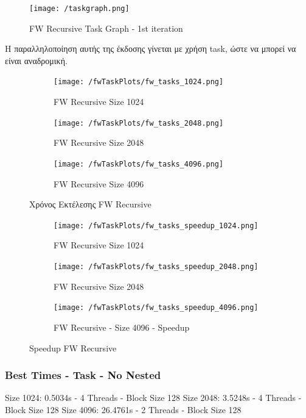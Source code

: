 \documentclass[letterpaper,12pt]{article}
\begin{document}
\begin{figure}[H]
    \centering
    \texttt{[image: /taskgraph.png]}
    \caption{FW Recursive Task Graph - 1st iteration}
    \label{fig:FW Recursive Task Graph}
\end{figure}

Η παραλληλοποίηση αυτής της έκδοσης γίνεται με χρήση task, ώστε να μπορεί να είναι αναδρομική.


\begin{figure}[H]
    \centering
    \begin{subfigure}[b]{0.45\linewidth}
        \texttt{[image: /fwTaskPlots/fw\_tasks\_1024.png]}
        \caption{FW Recursive Size 1024}
    \end{subfigure}
    \begin{subfigure}[b]{0.45\linewidth}
        \texttt{[image: /fwTaskPlots/fw\_tasks\_2048.png]}
        \caption{FW Recursive Size 2048}
    \end{subfigure}
    \begin{subfigure}[b]{0.5\linewidth}
        \texttt{[image: /fwTaskPlots/fw\_tasks\_4096.png]}
        \caption{FW Recursive Size 4096}
    \end{subfigure}
    \caption{Χρόνος Εκτέλεσης FW Recursive}
    \label{fig:Χρόνος Εκτέλεσης FW Recursive}
\end{figure}

\begin{figure}[H]
    \centering
    \begin{subfigure}[b]{0.48\linewidth}
        \texttt{[image: /fwTaskPlots/fw\_tasks\_speedup\_1024.png]}
        \caption{FW Recursive Size 1024}
    \end{subfigure}
    \begin{subfigure}[b]{0.48\linewidth}
        \texttt{[image: /fwTaskPlots/fw\_tasks\_speedup\_2048.png]}
        \caption{FW Recursive Size 2048}
    \end{subfigure}
    \begin{subfigure}[b]{0.5\linewidth}
        \texttt{[image: /fwTaskPlots/fw\_tasks\_speedup\_4096.png]}
        \caption{FW Recursive - Size 4096 - Speedup}
    \end{subfigure}
    \caption{Speedup FW Recursive}
    \label{fig:Speedup FW Recursive}
\end{figure}

\subsubsection*{Best Times - Task - No Nested}
Size 1024: 0.5034s - 4 Threads - Block Size 128
\newline
Size 2048: 3.5248s - 4 Threads - Block Size 128
\newline
Size 4096: 26.4761s - 2 Threads - Block Size 128
\newline
\end{document}
